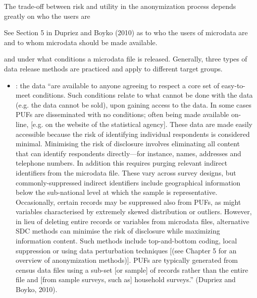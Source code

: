 \documentclass[letterpaper,10pt,english]{sphinxmanual}
\begin{document}
The trade-off between risk and utility in the anonymization process
depends greatly on who the users are %
\begin{footnote}[2]\sphinxAtStartFootnote
See Section 5 in Dupriez and Boyko (2010) as to who the users of
microdata are and to whom microdata should be made available.
%
\end{footnote} and under
what conditions a microdata file is released. Generally, three types of
data release methods are practiced and apply to different target groups.
\begin{itemize}
\item {} 
: the data “are available to anyone agreeing
to respect a core set of easy-to-meet conditions. Such conditions
relate to what cannot be done with the data (e.g. the data cannot be
sold), upon gaining access to the data. In some cases PUFs are
disseminated with no conditions; often being made available on-line,
{[}e.g. on the website of the statistical agency{]}. These data are made
easily accessible because the risk of identifying individual
respondents is considered minimal. Minimising the risk of disclosure
involves eliminating all content that can identify respondents
directly—for instance, names, addresses and telephone numbers. In
addition this requires purging relevant indirect identifiers from the
microdata file. These vary across survey designs, but
commonly-suppressed indirect identifiers include geographical
information below the sub-national level at which the sample is
representative. Occasionally, certain records may be suppressed also
from PUFs, as might variables characterised by extremely skewed
distribution or outliers. However, in lieu of deleting entire records
or variables from microdata files, alternative SDC methods can
minimise the risk of disclosure while maximizing information content.
Such methods include top-and-bottom coding, local suppression or
using data perturbation techniques {[}(see Chapter 5 for an overview of
anonymization methods){]}. PUFs are typically generated from census
data files using a sub-set {[}or sample{]} of records rather than the
entire file and {[}from sample surveys, such as{]} household surveys.”
(Dupriez and Boyko, 2010).


\end{itemize}
\end{document}
